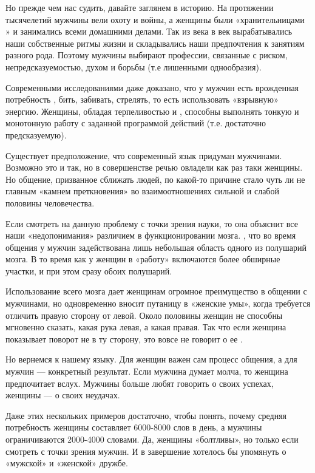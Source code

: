 Но прежде чем нас судить, давайте заглянем в историю. На протяжении тысячелетий мужчины вели охоту и войны, а женщины были «хранительницами » и занимались всеми домашними делами. Так из века в век вырабатывались наши собственные ритмы жизни и складывались наши предпочтения к занятиям разного рода. Поэтому мужчины выбирают профессии, связанные с риском, непредсказуемостью, духом  и борьбы (т.е лишенными однообразия).

Современными исследованиями даже доказано, что у мужчин есть врожденная потребность , бить, забивать, стрелять, то есть использовать «взрывную» энергию. Женщины, обладая терпеливостью и , способны выполнять тонкую и монотонную работу с заданной программой действий (т.е. достаточно предсказуемую).

Существует предположение, что современный язык придуман мужчинами. Возможно это и так, но в совершенстве речью овладели как раз таки женщины. Но общение, призванное сближать людей, по какой-то причине стало чуть ли не главным «камнем преткновения» во взаимоотношениях сильной и слабой половины человечества.

Если смотреть на данную проблему с точки зрения науки, то она объяснит все наши «недопонимания» различием в функционировании мозга. , что во время общения у мужчин задействована лишь небольшая область одного из полушарий мозга. В то время как у женщин в «работу» включаются более обширные участки, и при этом сразу обоих полушарий.

Использование всего мозга дает женщинам огромное преимущество в общении с мужчинами, но одновременно вносит путаницу в «женские умы», когда требуется отличить правую сторону от левой. Около половины женщин не способны мгновенно сказать, какая рука левая, а какая правая. Так что если женщина показывает поворот не в ту сторону, это вовсе не говорит о ее .

Но вернемся к нашему языку. Для женщин важен сам процесс общения, а для мужчин --- конкретный результат. Если мужчина думает молча, то женщина предпочитает  вслух. Мужчины больше любят говорить о своих успехах, женщины --- о своих неудачах.

Даже этих нескольких примеров достаточно, чтобы понять, почему средняя потребность женщины составляет 6000-8000 слов в день, а мужчины ограничиваются 2000-4000 словами.
Да, женщины «болтливы», но только если смотреть с точки зрения мужчин.
И в завершение хотелось бы упомянуть о «мужской» и «женской» дружбе.

